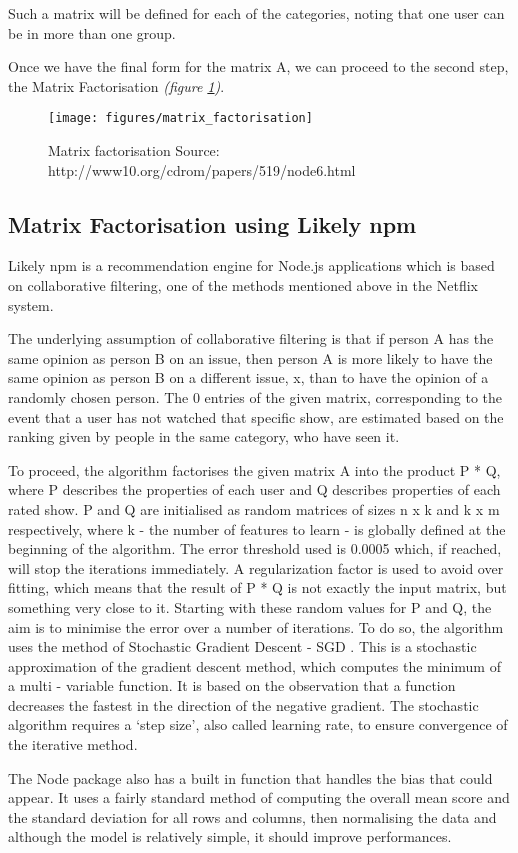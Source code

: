 Such a matrix will be defined for each of the categories, noting that one user can be in more than one group.

Once we have the final form for the matrix A, we can proceed to the second step, the Matrix Factorisation \textit{(figure \ref{fig:matrixfactorisation})}.

\begin{figure}[h]
\centering
\texttt{[image: figures/matrix\_factorisation]}
\caption{Matrix factorisation \newline Source: http://www10.org/cdrom/papers/519/node6.html}
\label{fig:matrixfactorisation}
\end{figure}

\subsection{Matrix Factorisation using Likely npm}


Likely npm \cite{liekly} is a recommendation engine for Node.js applications which is based on collaborative filtering, one of the methods mentioned above in the Netflix system. 

The underlying assumption of collaborative filtering is that if person A has the same opinion as person B on an issue, then person A is more likely to have the same opinion as person B on a different issue, x, than to have the opinion of a randomly chosen person. \cite{cf}
The 0 entries of the given matrix, corresponding to the event that a user has not watched that specific show, are estimated based on the ranking given by people in the same category, who have seen it.

To proceed, the algorithm factorises the given matrix A into the product P * Q, where P describes the properties of each user and Q describes properties of each rated show. P and Q are initialised as random matrices of sizes n x k and k x m respectively, where k - the number of features to learn - is globally defined at the beginning of the algorithm. The error threshold used is 0.0005 which, if reached, will stop the iterations immediately. A regularization factor is used to avoid over fitting, which means that the result of P * Q is not exactly the input matrix, but something very close to it. Starting with these random values for P and Q, the aim is to minimise the error over a number of iterations. To do so, the algorithm uses the method of Stochastic Gradient Descent - SGD \cite{sgd}. This is a stochastic approximation of the gradient descent method, which computes the minimum of a multi - variable function. It is based on the observation that a function decreases the fastest in the direction of the negative gradient. 
The stochastic algorithm requires a ‘step size', also called learning rate, to ensure convergence of the iterative method.

The Node package also has a built in function that handles the bias that could appear. It uses a fairly standard method of computing the overall mean score and the standard deviation for all rows and columns, then normalising the data and although the model is relatively simple, it should improve performances.